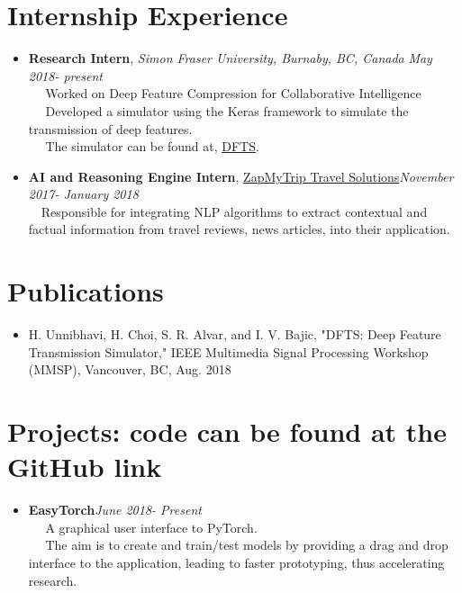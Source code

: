 \documentclass[margin, centered]{res}
\begin{document}
\begin{resume}
\section{\textbf{Internship Experience}}
\begin{itemize}
\item \textbf{Research Intern}, \textit{Simon Fraser University, Burnaby, BC, Canada}
\hfill\textit{May 2018- present}\\
~\textbullet~ Worked on Deep Feature Compression for Collaborative Intelligence\\
~\textbullet~ Developed a simulator using the Keras framework to simulate the transmission of deep features.\\
~\textbullet~ The simulator can be found at, \href{https://github.com/SFU-Multimedia-Lab/DFTS}{DFTS}.
\end{itemize}
\begin{itemize}
\item \textbf{AI and Reasoning Engine Intern}, \href{https://www.voyazer.net/}{ZapMyTrip Travel Solutions}\hfill\textit{November 2017- January 2018}\\
~\textbullet~Responsible for integrating NLP algorithms to extract contextual and factual information from travel reviews, news articles, into their application.
\end{itemize}

\section{\textbf{Publications}}
\begin{itemize}
\item H. Unnibhavi, H. Choi, S. R. Alvar, and I. V. Bajic, "DFTS: Deep Feature Transmission Simulator," IEEE Multimedia Signal Processing Workshop (MMSP), Vancouver, BC, Aug. 2018
\end{itemize}

\section{\textbf{Projects: code can be found at the GitHub link}}
\begin{itemize}
\item \textbf{EasyTorch}\hfill\textit{June 2018- Present}\\
~\textbullet~ A graphical user interface to PyTorch.\\
~\textbullet~ The aim is to create and train/test models by providing a drag and drop interface to the application, leading to faster prototyping, thus accelerating research. 
\end{itemize}



\end{resume}
\end{document}
